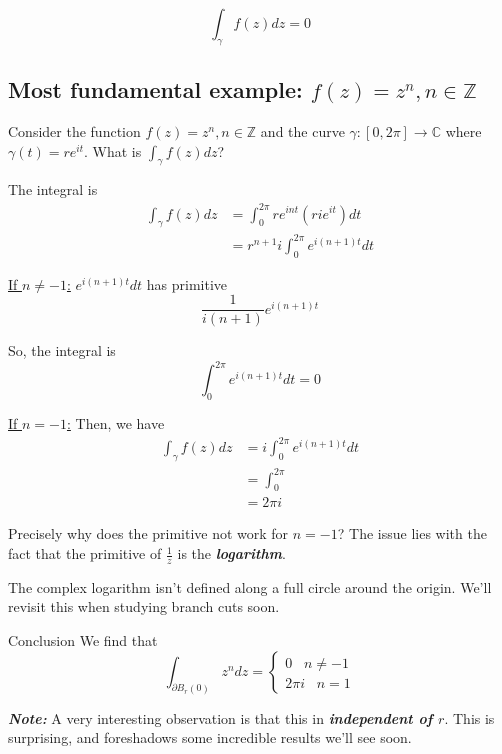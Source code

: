 \documentclass{article}
\newcommand{\C}{\mathbb{C}}
\begin{document}
\[ \int_{\gamma} f(z)dz = 0 \]

\vskip 1cm
\subsection{Most fundamental example: $f(z) = z^n, n \in \mathbb{Z}$}
  
Consider  the function $f(z) = z^n, n \in \mathbb{Z}$ and the curve $\gamma : [0, 2\pi] \rightarrow \C$ where $\gamma(t) = re^{it}$. What is $\int_{\gamma} f(z) dz$?

\begin{dottedbox}
  The integral is 
  \begin{align*}
    \int_{\gamma} f(z) dz &= \int_{0}^{2\pi} re^{int} (ri e^{it})dt \\
    &= r^{n+1}i \int_{0}^{2\pi} e^{i(n+1)t} dt
  \end{align*}

  \vskip 0.5cm
  \underline{If $n \neq -1$:} $e^{i(n+1)t}dt$ has primitive 
  \[ \frac{1}{i(n+1)}e^{i(n+1)t} \]

  So, the integral is 
  \[ \int_{0}^{2\pi} e^{i(n+1)t} dt = 0 \]

  \vskip 0.5cm
  \underline{If $n = -1$:} Then, we have 
  \begin{align*}
    \int_{\gamma}f(z) dz &= i\int_{0}^{2\pi} e^{i(n+1)t} dt \\
    &= \int_{0}^{2\pi} \\
    &= 2\pi i 
  \end{align*}
\end{dottedbox}

\vskip 0.5cm
Precisely why does the primitive not work for $n = -1$? The issue lies with the fact that the primitive of $\frac{1}{z}$ is the \textbf{\emph{logarithm}}.

The complex logarithm isn't defined along a full circle around the origin. We'll revisit this when studying branch cuts soon.

\vskip 0.5cm
\begin{mathdefinitionbox}{Conclusion}
  \vskip 0.5cm
  We find that 
  \[ \int_{\partial B_r(0)} z^n dz = \begin{cases}
    0 \;\;\; n \neq -1 \\
    2\pi i \;\;\; n = 1
  \end{cases} \]
\end{mathdefinitionbox}

\vskip 0.5cm
\textbf{\emph{Note:}} A very interesting observation is that this in \textbf{\emph{independent of $r$}}. This is surprising, and foreshadows some incredible results we'll see soon.
\end{document}
